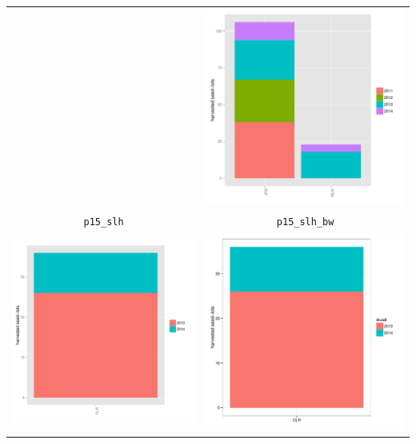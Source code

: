 \documentclass{article}\usepackage[]{graphicx}\usepackage[]{color}
\newenvironment{knitrout}{}{} %
\begin{document}
\begin{itemize}
\begin{center}
\begin{tabular}{cc}
\begin{knitrout}
{}



\end{knitrout}
&
\begin{knitrout}
\definecolor{shadecolor}{rgb}{0.969, 0.969, 0.969}\color{fgcolor}

{\centering \includegraphics[width=.4\textwidth]{figures/shinemas2R_unnamed-chunk-41-1} 

}



\end{knitrout}
\\
\texttt{p15\_slh} & \texttt{p15\_slh\_bw}  \\
\begin{knitrout}
\definecolor{shadecolor}{rgb}{0.969, 0.969, 0.969}\color{fgcolor}

{\centering \includegraphics[width=.4\textwidth]{figures/shinemas2R_unnamed-chunk-42-1} 

}



\end{knitrout}
&
\begin{knitrout}
\definecolor{shadecolor}{rgb}{0.969, 0.969, 0.969}\color{fgcolor}

{\centering \includegraphics[width=.4\textwidth]{figures/shinemas2R_unnamed-chunk-43-1} 

}
\end{knitrout}
\end{tabular}
\end{center}
\end{itemize}
\end{document}
